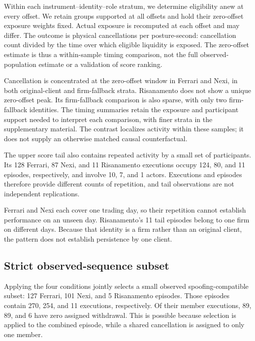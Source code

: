 \documentclass[11pt]{article}
\begin{document}
Within each instrument--identity--role stratum, we determine eligibility anew at every offset. We retain groups supported at all offsets and hold their zero-offset exposure weights fixed. Actual exposure is recomputed at each offset and may differ. The outcome is physical cancellations per posture-second: cancellation count divided by the time over which eligible liquidity is exposed. The zero-offset estimate is thus a within-sample timing comparison, not the full observed-population estimate or a validation of score ranking.


Cancellation is concentrated at the zero-offset window in Ferrari and Nexi, in both original-client and firm-fallback strata. Risanamento does not show a unique zero-offset peak. Its firm-fallback comparison is also sparse, with only two firm-fallback identities. The timing summaries retain the exposure and participant support needed to interpret each comparison, with finer strata in the supplementary material. The contrast localizes activity within these samples; it does not supply an otherwise matched causal counterfactual.

\FloatBarrier

The upper score tail also contains repeated activity by a small set of participants. Its 128 Ferrari, 87 Nexi, and 11 Risanamento executions occupy 124, 80, and 11 episodes, respectively, and involve 10, 7, and 1 actors. Executions and episodes therefore provide different counts of repetition, and tail observations are not independent replications.

Ferrari and Nexi each cover one trading day, so their repetition cannot establish performance on an unseen day. Risanamento's 11 tail episodes belong to one firm on different days. Because that identity is a firm rather than an original client, the pattern does not establish persistence by one client.

\FloatBarrier

\subsection{Strict observed-sequence subset}
\label{subsec:strict_sequence_subset_results}

Applying the four conditions jointly selects a small observed spoofing-compatible subset: 127 Ferrari, 101 Nexi, and 5 Risanamento episodes. Those episodes contain 270, 254, and 11 executions, respectively. Of their member executions, 89, 89, and 6 have zero assigned withdrawal. This is possible because selection is applied to the combined episode, while a shared cancellation is assigned to only one member.
\end{document}
